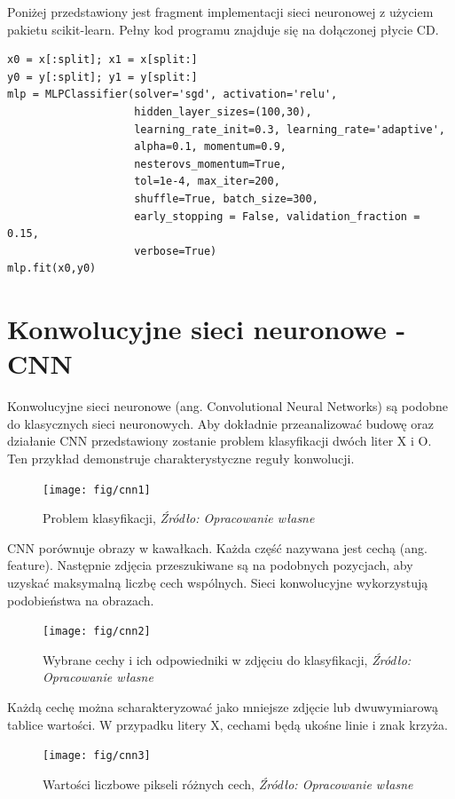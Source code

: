 \documentclass[brudnopis]{xmgr}
\begin{document}
Poniżej przedstawiony jest fragment implementacji sieci neuronowej z użyciem pakietu scikit-learn\cite{17}. Pełny kod programu znajduje się na dołączonej płycie CD.

\begin{verbatim}
x0 = x[:split]; x1 = x[split:]
y0 = y[:split]; y1 = y[split:]
mlp = MLPClassifier(solver='sgd', activation='relu',
                    hidden_layer_sizes=(100,30),
                    learning_rate_init=0.3, learning_rate='adaptive', 
                    alpha=0.1, momentum=0.9, 
                    nesterovs_momentum=True,
                    tol=1e-4, max_iter=200,
                    shuffle=True, batch_size=300,
                    early_stopping = False, validation_fraction = 0.15,
                    verbose=True)
mlp.fit(x0,y0)
\end{verbatim}

\newpage

\section{Konwolucyjne sieci neuronowe - CNN}

Konwolucyjne sieci neuronowe (ang. Convolutional Neural Networks)\cite{14} są podobne do klasycznych sieci neuronowych. Aby dokładnie przeanalizować budowę oraz działanie CNN przedstawiony zostanie problem klasyfikacji dwóch liter X i O. Ten przykład demonstruje charakterystyczne reguły konwolucji.

\begin{figure}[!tbh]
\centering
\texttt{[image: fig/cnn1]}
\caption{Problem klasyfikacji, \emph{Źródło: Opracowanie własne}}
\end{figure}

CNN porównuje obrazy w kawałkach. Każda część nazywana jest cechą (ang. feature). Następnie zdjęcia przeszukiwane są na podobnych pozycjach, aby uzyskać maksymalną liczbę cech wspólnych. Sieci konwolucyjne wykorzystują podobieństwa na obrazach.

\begin{figure}[!tbh]
\centering
\texttt{[image: fig/cnn2]}
\caption{Wybrane cechy i ich odpowiedniki w zdjęciu do klasyfikacji, \emph{Źródło: Opracowanie własne}}
\end{figure}
\newpage

Każdą cechę można scharakteryzować jako mniejsze zdjęcie lub dwuwymiarową tablice wartości. W przypadku litery X, cechami będą ukośne linie i znak krzyża.

\begin{figure}[!tbh]
\centering
\texttt{[image: fig/cnn3]}
\caption{Wartości liczbowe pikseli różnych cech, \emph{Źródło: Opracowanie własne}}
\end{figure}
\end{document}
